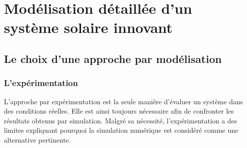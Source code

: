 
\section{Modélisation détaillée d’un système solaire innovant} %
\label{sec:modelisation_detaillee_d_un_systeme_solaire_innovant}
\subsection{Le choix d’une approche par modélisation} %
\label{sub:le_choix_d_une_approche_par_modelisation}
\subsubsection{L’expérimentation} %
\label{ssub:l_experimentation}
L’approche par expérimentation est la seule manière d’évaluer un système dans des
conditions réelles. Elle est ainsi toujours nécessaire afin de confronter les résultats
obtenus par simulation. Malgré sa nécessité, l’expérimentation a des limites expliquant
pourquoi la simulation numérique est considéré comme une alternative pertinente.

